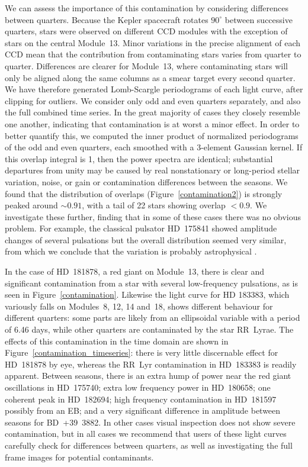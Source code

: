 \documentclass[modern]{aastex62}
\begin{document}
We can assess the importance of this contamination by considering differences between quarters. Because the Kepler spacecraft rotates $90^\circ$ between successive quarters, stars were observed on different CCD modules with the exception of stars on the central Module~13. Minor variations in the precise alignment of each CCD mean that the contribution from contaminating stars varies from quarter to quarter. Differences are clearer for Module~13, where contaminating stars will only be aligned along the same columns as a smear target every second quarter. We have therefore generated Lomb-Scargle periodograms \citep{lomb,scargle} of each light curve, after clipping for outliers. We consider only odd and even quarters separately, and also the full combined time series. In the great majority of cases they closely resemble one another, indicating that contamination is at worst a minor effect. In order to better quantify this, we computed the inner product of normalized periodograms of the odd and even quarters, each smoothed with a 3-element Gaussian kernel. If this overlap integral is 1, then the power spectra are identical; substantial departures from unity may be caused by real nonstationary or long-period stellar variation, noise, or gain or contamination differences between the seasons. We found that the distribution of overlaps (Figure~\ref{contamination2}) is strongly peaked around $\sim 0.91$, with a tail of 22 stars showing overlap $< 0.9$. We investigate these further, finding that in some of these cases  there was no obvious problem. For example, the classical pulsator HD~175841 showed amplitude changes of several pulsations but the overall distribution seemed very similar, from which we conclude that the variation is probably astrophysical \citep[as in][]{2016MNRAS.460.1970B}. 

In the case of HD~181878, a red giant on Module~13, there is clear and significant contamination from a star with several low-frequency pulsations, as is seen in Figure~\ref{contamination}. Likewise the light curve for HD 183383, which variously falls on Modules~8, 12, 14 and~18, shows different behaviour for different quarters: some parts are likely from an ellipsoidal variable with a period of 6.46 days, while other quarters are contaminated by the star RR~Lyrae. The effects of this contamination in the time domain are shown in Figure~\ref{contamination_timeseries}: there is very little discernable effect for HD~181878 by eye, whereas the RR~Lyr contamination in HD~183383 is readily apparent. Between seasons, there is an extra hump of power near the red giant oscillations in HD~175740; extra low frequency power in HD~180658; one coherent peak in  HD~182694; high frequency contamination in HD~181597 possibly from an EB; and a very significant difference in amplitude between seasons for BD~+39~3882. In other cases visual inspection does not show severe contamination, but in all cases we recommend that users of these light curves carefully check for differences between quarters, as well as investigating the full frame images for potential contaminants.
\end{document}
